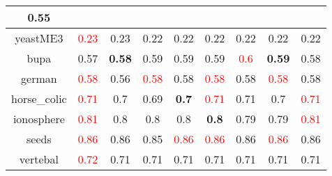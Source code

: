 \documentclass{article}%
\begin{document}
\begin{tabular}{c|cccccccc}
{0.55
}\\%
\hline%
yeastME3&\textcolor{red}{ 
0.23
}&0.23&0.22&0.22&0.22&0.22&0.22&0.22\\%
\hline%
bupa&0.57&\textbf{0.58}&0.59&0.59&0.59&\textcolor{red}{ 
0.6
}&\textbf{0.59}&0.58\\%
\hline%
german&\textcolor{red}{ 
0.58
}&0.56&\textcolor{red}{ 
0.58
}&0.58&\textcolor{red}{ 
0.58
}&0.58&\textcolor{red}{ 
0.58
}&0.58\\%
\hline%
horse\_colic&\textcolor{red}{ 
0.71
}&0.7&0.69&\textbf{0.7}&\textcolor{red}{ 
0.71
}&0.71&0.7&\textcolor{red}{ 
0.71
}\\%
\hline%
ionosphere&\textcolor{red}{ 
0.81
}&0.8&0.8&0.8&\textbf{0.8}&0.79&0.79&\textcolor{red}{ 
0.81
}\\%
\hline%
seeds&\textcolor{red}{ 
0.86
}&0.86&0.85&\textcolor{red}{ 
0.86
}&\textcolor{red}{ 
0.86
}&0.86&\textcolor{red}{ 
0.86
}&0.86\\%
\hline%
vertebal&\textcolor{red}{ 
0.72
}&0.71&0.71&0.71&0.71&0.71&0.71&0.71\\%
\hline%
\end{tabular}

%
\end{document}
